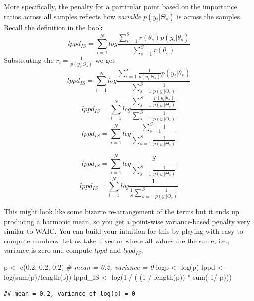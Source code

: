 \documentclass[
]{book}
\newenvironment{Shaded}{\begin{snugshade}}{\end{snugshade}}
\newcommand{\CommentTok}[1]{\textcolor[rgb]{0.56,0.35,0.01}{\textit{#1}}}
\newcommand{\DecValTok}[1]{\textcolor[rgb]{0.00,0.00,0.81}{#1}}
\newcommand{\FloatTok}[1]{\textcolor[rgb]{0.00,0.00,0.81}{#1}}
\newcommand{\FunctionTok}[1]{\textcolor[rgb]{0.00,0.00,0.00}{#1}}
\newcommand{\NormalTok}[1]{#1}
\newcommand{\OtherTok}[1]{\textcolor[rgb]{0.56,0.35,0.01}{#1}}
\newcommand{\SpecialCharTok}[1]{\textcolor[rgb]{0.00,0.00,0.00}{#1}}
\begin{document}
More specifically, the penalty for a particular point based on the importance ratios across all samples reflects how \emph{variable} \(p(y_i|\Theta_s)\) is across the samples. Recall the definition in the book
\[lppd_{IS} = \sum^N_{i=1} log \frac{\sum^S_{s=1}r(\theta_s)p(y_i|\theta_s)}{\sum^S_{s=1}r(\theta_s)}\]
Substituting the \(r_i = \frac{1}{p(y_i|\Theta_s)}\) we get
\[lppd_{IS} = \sum^N_{i=1} log \frac{\sum^S_{s=1}\frac{1}{p(y_i|\Theta_s)}p(y_i|\theta_s)}{\sum^S_{s=1}\frac{1}{p(y_i|\Theta_s)}}\]
\[lppd_{IS} = \sum^N_{i=1} log \frac{\sum^S_{s=1}\frac{p(y_i|\theta_s)}{p(y_i|\Theta_s)}}{\sum^S_{s=1}\frac{1}{p(y_i|\Theta_s)}}\]
\[lppd_{IS} = \sum^N_{i=1} log \frac{\sum^S_{s=1}1}{\sum^S_{s=1}\frac{1}{p(y_i|\Theta_s)}}\]

\[lppd_{IS} = \sum^N_{i=1} log \frac{S}{\sum^S_{s=1}\frac{1}{p(y_i|\Theta_s)}}\]
\[lppd_{IS} = \sum^N_{i=1} log \frac{1}{\frac{1}{S}\sum^S_{s=1}\frac{1}{p(y_i|\Theta_s)}}\]

This might look like some bizarre re-arrangement of the terms but it ends up producing a \href{https://en.wikipedia.org/wiki/Harmonic_mean}{harmonic mean}, so you get a point-wise variance-based penalty very similar to WAIC. You can build your intuition for this by playing with easy to compute numbers. Let us take a vector where all values are the same, i.e., variance is zero and compute \(lppd\) and \(lppd_{IS}\).

\begin{Shaded}
\begin{Highlighting}[]
\NormalTok{p }\OtherTok{\textless{}{-}} \FunctionTok{c}\NormalTok{(}\FloatTok{0.2}\NormalTok{, }\FloatTok{0.2}\NormalTok{, }\FloatTok{0.2}\NormalTok{) }\CommentTok{\# mean = 0.2, variance = 0}
\NormalTok{logp }\OtherTok{\textless{}{-}} \FunctionTok{log}\NormalTok{(p)}
\NormalTok{lppd }\OtherTok{\textless{}{-}} \FunctionTok{log}\NormalTok{(}\FunctionTok{sum}\NormalTok{(p)}\SpecialCharTok{/}\FunctionTok{length}\NormalTok{(p))}
\NormalTok{lppd\_IS }\OtherTok{\textless{}{-}} \FunctionTok{log}\NormalTok{(}\DecValTok{1} \SpecialCharTok{/}\NormalTok{ ( (}\DecValTok{1} \SpecialCharTok{/} \FunctionTok{length}\NormalTok{(p)) }\SpecialCharTok{*} \FunctionTok{sum}\NormalTok{( }\DecValTok{1}\SpecialCharTok{/}\NormalTok{ p)))}
\end{Highlighting}
\end{Shaded}

\begin{verbatim}
## mean = 0.2, variance of log(p) = 0
\end{verbatim}
\end{document}
